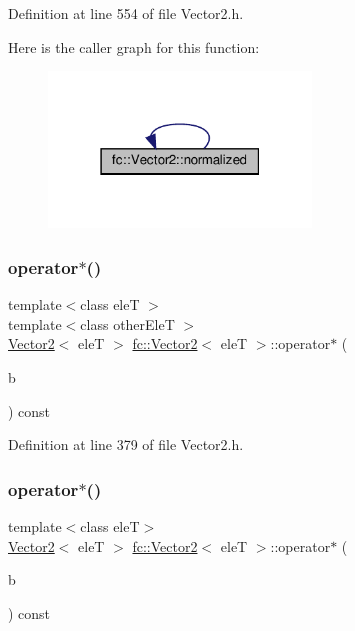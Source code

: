 Definition at line 554 of file Vector2.\+h.

Here is the caller graph for this function\+:
\nopagebreak
\begin{figure}[H]
\begin{center}
\leavevmode
\includegraphics[width=198pt]{d9/d08/classfc_1_1Vector2_a567f189a7a5f7871f0648d241e81f7ee_icgraph}
\end{center}
\end{figure}
\mbox{\label{classfc_1_1Vector2_a5b839a912dfd536facec32a7dd6e098b}} 
\subsubsection{\texorpdfstring{operator$\ast$()}{operator*()}\hspace{0.1cm}{\footnotesize\ttfamily [1/2]}}
{\footnotesize\ttfamily template$<$class eleT $>$ \\
template$<$class other\+EleT $>$ \\
\hyperlink{classfc_1_1Vector2}{Vector2}$<$ eleT $>$ \hyperlink{classfc_1_1Vector2}{fc\+::\+Vector2}$<$ eleT $>$\+::operator$\ast$ (\begin{DoxyParamCaption}\item[{const \hyperlink{classfc_1_1Vector2}{Vector2}$<$ other\+EleT $>$ \&}]{b }\end{DoxyParamCaption}) const}



Definition at line 379 of file Vector2.\+h.

\mbox{\label{classfc_1_1Vector2_a95ca7ccecaf2c836675aa8a6f8972061}} 
\subsubsection{\texorpdfstring{operator$\ast$()}{operator*()}\hspace{0.1cm}{\footnotesize\ttfamily [2/2]}}
{\footnotesize\ttfamily template$<$class eleT$>$ \\
\hyperlink{classfc_1_1Vector2}{Vector2}$<$ eleT $>$ \hyperlink{classfc_1_1Vector2}{fc\+::\+Vector2}$<$ eleT $>$\+::operator$\ast$ (\begin{DoxyParamCaption}\item[{eleT}]{b }\end{DoxyParamCaption}) const}



